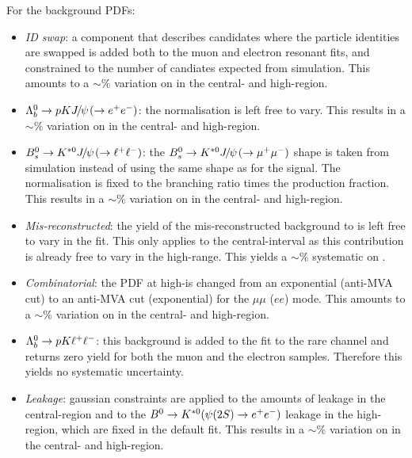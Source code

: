For the background PDFs:
%
\begin{itemize}

\item \textit{ID swap}: a component that describes candidates where the particle identities are swapped
is added both to the muon and electron resonant fits, and constrained to the number of candiates
expected from simulation. This amounts to a $\sim \%$ variation on \RKst in the central- and high-\qsq region.

\item $\Lb\to pK\jpsi(\to \ee)$: the normalisation is left free to vary.
This results in a $\sim \%$ variation on \RKst in the central- and high-\qsq region.

\item $\Bs\to\Kstarz\jpsi(\to \ll)$: the $\Bs\to\Kstarz\jpsi(\to \mumu)$ shape is taken from simulation
instead of using the same shape as for the signal. The normalisation is fixed
to the branching ratio times the production fraction.
This results in a $\sim \%$ variation on \RKst in the central- and high-\qsq region.

\item \textit{Mis-reconstructed}: the yield of the mis-reconstructed background to \BdToKstee is left free to vary in the fit.
This only applies to the central-\qsq interval as this contribution is already free to vary in the high-\qsq range.
This yields a $\sim \%$ systematic on \RKst.

\item \textit{Combinatorial}: the PDF at high-\qsq is changed from an exponential (anti-MVA cut) to an anti-MVA
cut (exponential) for the $\mu\mu$ ($ee$) mode. This amounts to a $\sim \%$ variation on \RKst in the central- and high-\qsq region.

\item ${{\Lambda}^0_{b}}\rightarrow pK \ell^+ \ell^-$: this background is added to the fit to the rare channel and returns zero yield for both the muon and the electron samples.
Therefore this yields no systematic uncertainty.

\item \textit{Leakage}: gaussian constraints are applied to the amounts of \BdToKstJPsee leakage in the central-\qsq region
 and to the $\Bz\to\Kstarz(\psitwos\to \ee)$ leakage in the high-\qsq region, which are fixed in the default fit.
This results in a $\sim \%$ variation on \RKst in the central- and high-\qsq region.

\end{itemize}



